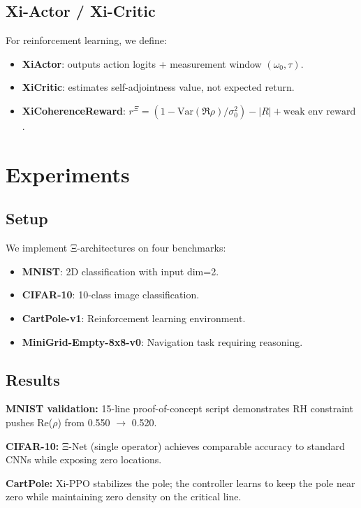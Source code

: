 \documentclass[11pt]{article}
\begin{document}
\subsection{Xi-Actor / Xi-Critic}

For reinforcement learning, we define:

\begin{itemize}
\item \textbf{XiActor}: outputs action logits + measurement window $(\omega_0,\tau)$.
\item \textbf{XiCritic}: estimates self-adjointness value, not expected return.
\item \textbf{XiCoherenceReward}: $r^\Xi = (1-\text{Var}(\Re\rho)/\sigma_0^2) - |R| + \text{weak env reward}$.
\end{itemize}

\section{Experiments}

\subsection{Setup}

We implement Ξ-architectures on four benchmarks:

\begin{itemize}
\item \textbf{MNIST}: 2D classification with input dim=2.
\item \textbf{CIFAR-10}: 10-class image classification.
\item \textbf{CartPole-v1}: Reinforcement learning environment.
\item \textbf{MiniGrid-Empty-8x8-v0}: Navigation task requiring reasoning.
\end{itemize}

\subsection{Results}

\textbf{MNIST validation:} 15-line proof-of-concept script demonstrates RH constraint pushes Re($\rho$) from 0.550 $\to$ 0.520.

\textbf{CIFAR-10:} Ξ-Net (single operator) achieves comparable accuracy to standard CNNs while exposing zero locations.

\textbf{CartPole:} Xi-PPO stabilizes the pole; the controller learns to keep the pole near zero while maintaining zero density on the critical line.
\end{document}
